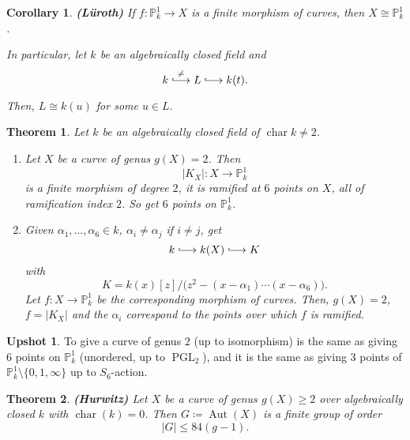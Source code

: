 \documentclass[12pt]{article}
\DeclareMathOperator{\PGL}{PGL}
\DeclareMathOperator{\chara}{char}
\DeclareMathOperator{\Aut}{Aut}
\newtheorem*{theorem}{Theorem}
\newtheorem*{corollary}{Corollary}
\theoremstyle{definition}
\newtheorem*{upshot}{Upshot}
\begin{document}
\begin{corollary}
\emph{\textbf{(L\"{u}roth)}} If $f:\mathbb{P}_k^1\rightarrow X$ is a finite morphism of curves, then $X\cong\mathbb{P}_k^1$.

In particular, let $k$ be an algebraically closed field and
\[k\overset{\neq}{\lhook\joinrel\longrightarrow}L\lhook\joinrel\longrightarrow k(t).\]

Then, $L\cong k(u)$ for some $u\in L$.
\end{corollary}

\begin{theorem}
Let $k$ be an algebraically closed field of $\chara k\neq2$.

\begin{enumerate}[label=\arabic*)]
\item Let $X$ be a curve of genus $g(X)=2$. Then
\[|K_X|:X\longrightarrow\mathbb{P}_k^1\]
is a finite morphism of degree $2$, it is ramified at $6$ points on $X$, all of ramification index $2$. So get $6$ points on $\mathbb{P}_k^1$.

\item Given $\alpha_1,\ldots,\alpha_6\in k$, $\alpha_i\neq\alpha_j$ if $i\neq j$, get
\[k\lhook\joinrel\longrightarrow k(X)\lhook\joinrel\longrightarrow K\]
with
\[K=k(x)[z]\big/\big(z^2-(x-\alpha_1)\cdots(x-\alpha_6)\big).\]
Let $f:X\rightarrow\mathbb{P}_k^1$ be the corresponding morphism of curves. Then, $g(X)=2$, $f=|K_X|$ and the $\alpha_i$ correspond to the points over which $f$ is ramified.
\end{enumerate}
\end{theorem}

\begin{upshot}
To give a curve of genus $2$ (up to isomorphism) is the same as giving $6$ points on $\mathbb{P}_k^1$ (unordered, up to $\PGL_2$), and it is the same as giving $3$ points of $\mathbb{P}_k^1\setminus\{0,1,\infty\}$ up to $S_6$-action.
\end{upshot}

\begin{theorem}
\emph{\textbf{(Hurwitz)}} Let $X$ be a curve of genus $g(X)\geq2$ over algebraically closed $k$ with $\chara(k)=0$. Then $G\coloneqq\Aut(X)$ is a finite group of order
\[|G|\leq84(g-1).\]
\end{theorem}
\end{document}
